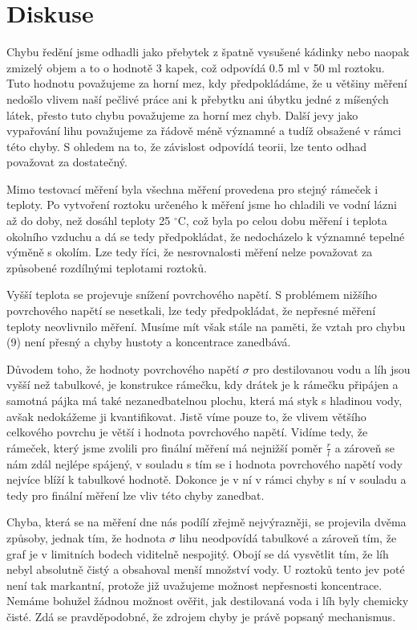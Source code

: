 \documentclass[a4paper]{article}
\begin{document}
\section*{Diskuse}
\par Chybu ředění jsme odhadli jako přebytek z špatně vysušené kádinky nebo naopak zmizelý objem a to o hodnotě 3 kapek, což odpovídá 0.5 ml v 50 ml roztoku. Tuto hodnotu považujeme za horní mez, kdy předpokládáme, že u většiny měření nedošlo vlivem naší pečlivé práce ani k přebytku ani úbytku jedné z míšených látek, přesto tuto chybu považujeme za horní mez chyb. Další jevy jako vypařování lihu považujeme za řádově méně významné a tudíž obsažené v rámci této chyby. S ohledem na to, že závislost odpovídá teorii, lze tento odhad považovat za dostatečný.
\par Mimo testovací měření byla všechna měření provedena pro stejný rámeček i teploty. Po vytvoření roztoku určeného k měření jsme ho chladili ve vodní lázni až do doby, než dosáhl teploty 25 $^\circ$C, což byla po celou dobu měření i teplota okolního vzduchu a dá se tedy předpokládat, že nedocházelo k významné tepelné výměně s okolím. Lze tedy říci, že nesrovnalosti měření nelze považovat za způsobené rozdílnými teplotami roztoků.
\par Vyšší teplota se projevuje snížení povrchového napětí. S problémem nižšího povrchového napětí se nesetkali, lze tedy předpokládat, že nepřesné měření teploty neovlivnilo měření. Musíme mít však stále na paměti, že vztah pro chybu (9) není přesný a chyby hustoty a koncentrace zanedbává.
\par Důvodem toho, že hodnoty povrchového napětí $\sigma$ pro destilovanou vodu a líh jsou vyšší než tabulkové, je konstrukce rámečku, kdy drátek je k rámečku připájen a samotná pájka má také nezanedbatelnou plochu, která má styk s hladinou vody, avšak nedokážeme ji kvantifikovat. Jistě víme pouze to, že vlivem většího celkového povrchu je větší i hodnota povrchového napětí. Vidíme tedy, že rámeček, který jsme zvolili pro finální měření má nejnižší poměr $\frac{r}{l}$ a zároveň se nám zdál nejlépe spájený, v souladu s tím se i hodnota povrchového napětí vody nejvíce blíží k tabulkové hodnotě. Dokonce je v ní v rámci chyby s ní v souladu a tedy pro finální měření lze vliv této chyby zanedbat.
\par Chyba, která se na měření dne nás podílí zřejmě nejvýrazněji, se projevila dvěma způsoby, jednak tím, že hodnota $\sigma$ lihu neodpovídá tabulkové a zároveň tím, že graf je v limitních bodech viditelně nespojitý. Obojí se dá vysvětlit tím, že líh nebyl absolutně čistý a obsahoval menší množství vody. U roztoků tento jev poté není tak markantní, protože již uvažujeme možnost nepřesnosti koncentrace. Nemáme bohužel žádnou možnost ověřit, jak destilovaná voda i líh byly chemicky čisté. Zdá se pravděpodobné, že zdrojem chyby je právě popsaný mechanismus.
\end{document}
